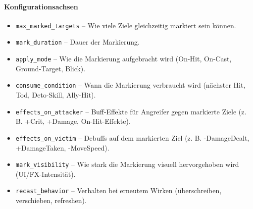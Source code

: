\paragraph{Konfigurationsachsen}{}

\begin{itemize}
	\item \texttt{max\_marked\_targets} – Wie viele Ziele gleichzeitig markiert sein können.
	\item \texttt{mark\_duration} – Dauer der Markierung.
	\item \texttt{apply\_mode} – Wie die Markierung aufgebracht wird (On-Hit, On-Cast, Ground-Target, Blick).
	\item \texttt{consume\_condition} – Wann die Markierung verbraucht wird (nächster Hit, Tod, Deto-Skill, Ally-Hit).
	\item \texttt{effects\_on\_attacker} – Buff-Effekte für Angreifer gegen markierte Ziele (z. B. +Crit, +Damage, On-Hit-Effekte).
	\item \texttt{effects\_on\_victim} – Debuffs auf dem markierten Ziel (z. B. -DamageDealt, +DamageTaken, -MoveSpeed).
	\item \texttt{mark\_visibility} – Wie stark die Markierung visuell hervorgehoben wird (UI/FX-Intensität).
	\item \texttt{recast\_behavior} – Verhalten bei erneutem Wirken (überschreiben, verschieben, refreshen).
\end{itemize}

